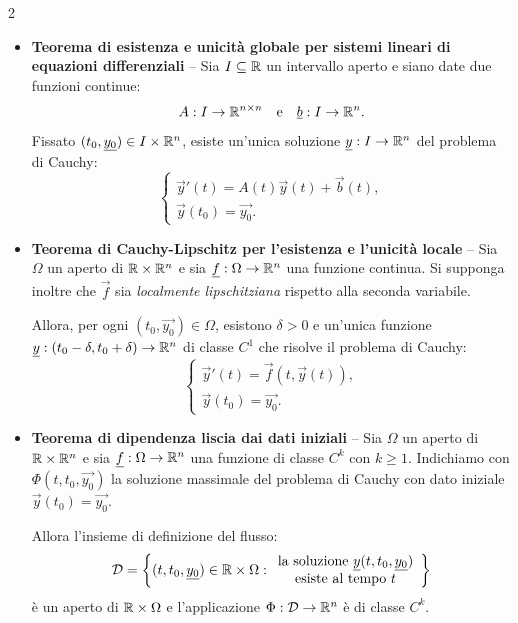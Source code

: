 \begin{multicols*}{2}
\begin{itemize}
            \item \textbf{Teorema di esistenza e unicità globale per sistemi lineari di equazioni differenziali} --
                  Sia $I \subseteq \mathbb{R}$ un intervallo aperto e siano date due funzioni continue:
                  \[ A : I \to \mathbb{R}^{n \times n} \quad \text{e} \quad {\underline{b}} : I \to \mathbb{R}^n. \]
                  Fissato $(t_0, {\underline{y_0}}) \in I \times \mathbb{R}^n$, esiste un'unica soluzione ${\underline{y}} : I \to \mathbb{R}^n$
                  del problema di Cauchy:
                  \[
                        \begin{cases}
                              \vec{y}'(t) = A(t)\vec{y}(t) + \vec{b}(t), \\
                              \vec{y}(t_0) = \vec{y_0}.
                        \end{cases}
                  \]

            \item \textbf{Teorema di Cauchy-Lipschitz per l'esistenza e l'unicità locale} --
                  Sia $\Omega$ un aperto di $\mathbb{R} \times \mathbb{R}^n$ e sia ${\underline{f}} : \Omega \to \mathbb{R}^n$ una funzione continua.
                  Si supponga inoltre che $\vec{f}$ sia \emph{localmente lipschitziana} rispetto alla seconda variabile. \smallskip

                  Allora, per ogni $(t_0, \vec{y_0}) \in \Omega$, esistono $\delta > 0$ e un'unica funzione
                  ${\underline{y}} : (t_0 - \delta, t_0 + \delta) \to \mathbb{R}^n$ di classe $C^1$ che risolve il problema di Cauchy:
                  \[
                        \begin{cases}
                              \vec{y}'(t) = \vec{f}(t, \vec{y}(t)), \\
                              \vec{y}(t_0) = \vec{y_0}.
                        \end{cases}
                  \]

            \item \textbf{Teorema di dipendenza liscia dai dati iniziali} --
                  Sia $\Omega$ un aperto di $\mathbb{R} \times \mathbb{R}^n$ e sia ${\underline{f}} : \Omega \to \mathbb{R}^n$ una funzione di classe
                  $C^k$ con $k \geq 1$. Indichiamo con $\Phi(t, t_0, \vec{y_0})$ la soluzione massimale del
                  problema di Cauchy con dato iniziale $\vec{y}(t_0) = \vec{y_0}$. \smallskip

                  Allora l'insieme di definizione del flusso:
                  \[
                        \mathcal{D} = \left\{ (t, t_0, {\underline{y_0}}) \in \mathbb{R} \times \Omega :
                        \begin{array}{c}
                              \text{la soluzione } {\underline{y}}(t, t_0, {\underline{y_0}}) \\
                              \text{esiste al tempo } t
                        \end{array}
                        \right\}
                  \]
                  è un aperto di $\mathbb{R} \times \Omega$ e l'applicazione $\Phi : \mathcal{D} \to \mathbb{R}^n$ è di classe $C^k$.


\end{itemize}
\end{multicols*}
